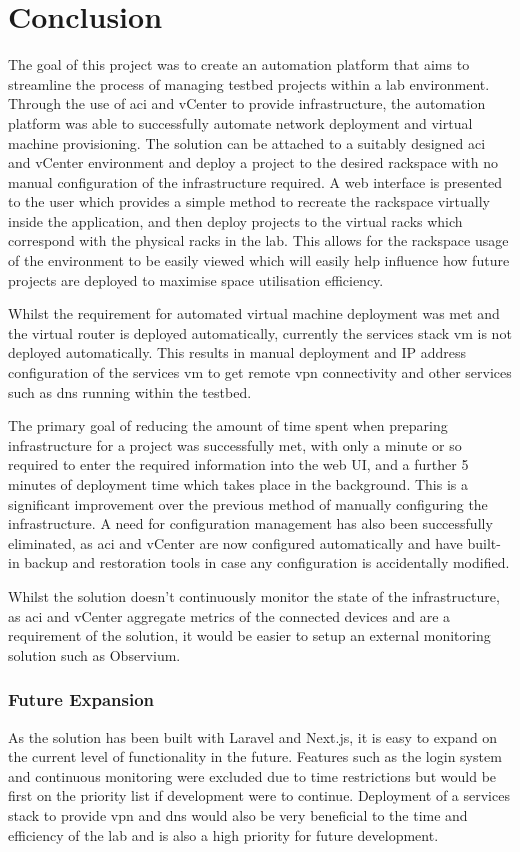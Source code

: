 \chapter{Conclusion}
\label{chap:conclusion}
The goal of this project was to create an automation platform that aims to streamline the process of managing testbed projects within a lab environment. Through the use of \gls{aci} and vCenter to provide infrastructure, the automation platform was able to successfully automate network deployment and virtual machine provisioning. The solution can be attached to a suitably designed \gls{aci} and vCenter environment and deploy a project to the desired rackspace with no manual configuration of the infrastructure required. A web interface is presented to the user which provides a simple method to recreate the rackspace virtually inside the application, and then deploy projects to the virtual racks which correspond with the physical racks in the lab. This allows for the rackspace usage of the environment to be easily viewed which will easily help influence how future projects are deployed to maximise space utilisation efficiency.

Whilst the requirement for automated virtual machine deployment was met and the virtual router is deployed automatically, currently the services stack \gls{vm} is not deployed automatically. This results in manual deployment and IP address configuration of the services \gls{vm} to get remote \gls{vpn} connectivity and other services such as \gls{dns} running within the testbed.

The primary goal of reducing the amount of time spent when preparing infrastructure for a project was successfully met, with only a minute or so required to enter the required information into the web UI, and a further 5 minutes of deployment time which takes place in the background. This is a significant improvement over the previous method of manually configuring the infrastructure. A need for configuration management has also been successfully eliminated, as \gls{aci} and vCenter are now configured automatically and have built-in backup and restoration tools in case any configuration is accidentally modified.

Whilst the solution doesn't continuously monitor the state of the infrastructure, as \gls{aci} and vCenter aggregate metrics of the connected devices and are a requirement of the solution, it would be easier to setup an external monitoring solution such as Observium.

\subsection{Future Expansion}
\label{sec:future-expansion}
As the solution has been built with Laravel and Next.js, it is easy to expand on the current level of functionality in the future. Features such as the login system and continuous monitoring were excluded due to time restrictions but would be first on the priority list if development were to continue. Deployment of a services stack to provide \gls{vpn} and \gls{dns} would also be very beneficial to the time and efficiency of the lab and is also a high priority for future development.

